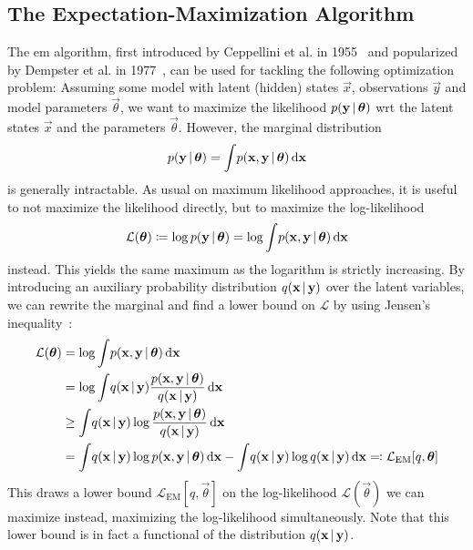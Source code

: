\subsection{The Expectation-Maximization Algorithm}
	The \ac{em} algorithm, first introduced by Ceppellini et al. in 1955~\cite{ceppelliniEstimationGeneFrequencies1955} and popularized by Dempster et al. in 1977~\cite{dempsterMaximumLikelihoodIncomplete1977}, can be used for tackling the following optimization problem: Assuming some model with latent (hidden) states \(\vec{x}\), observations \(\vec{y}\) and model parameters \(\vec{\theta}\), we want to maximize the likelihood \( p(\boldsymbol{\mathrm{y}} \,\vert\, \boldsymbol{\mathrm{\theta}}) \) \ac{wrt} the latent states \(\vec{x}\) and the parameters \(\vec{\theta}\). However, the marginal distribution
	\begin{align*}
		p(\boldsymbol{\mathrm{y}} \,\vert\, \boldsymbol{\mathrm{\theta}}) = \int\! p(\boldsymbol{\mathrm{x}}, \boldsymbol{\mathrm{y}} \,\vert\, \boldsymbol{\mathrm{\theta}}) \dd{\boldsymbol{\mathrm{x}}}
	\end{align*}
	is generally intractable. As usual on maximum likelihood approaches, it is useful to not maximize the likelihood directly, but to maximize the log-likelihood
	\begin{align*}
		\mathcal{L}(\boldsymbol{\mathrm{\theta}}) \coloneqq \log p(\boldsymbol{\mathrm{y}} \,\vert\, \boldsymbol{\mathrm{\theta}}) = \log \int\! p(\boldsymbol{\mathrm{x}}, \boldsymbol{\mathrm{y}} \,\vert\, \boldsymbol{\mathrm{\theta}}) \dd{\boldsymbol{\mathrm{x}}}
	\end{align*}
	instead. This yields the same maximum as the logarithm is strictly increasing. By introducing an auxiliary probability distribution \( q(\boldsymbol{\mathrm{x}} \,\vert\, \boldsymbol{\mathrm{y}}) \) over the latent variables, we can rewrite the marginal and find a lower bound on \(\mathcal{L}\) by using Jensen's inequality~\cite{jensenFonctionsConvexesInegalites1906}:
	\begin{align}
		\mathcal{L}(\boldsymbol{\mathrm{\theta}})
			&= \log \int\! p(\boldsymbol{\mathrm{x}}, \boldsymbol{\mathrm{y}} \,\vert\, \boldsymbol{\mathrm{\theta}}) \dd{\boldsymbol{\mathrm{x}}}  \nonumber \\
			&= \log \int\! q(\boldsymbol{\mathrm{x}} \,\vert\, \boldsymbol{\mathrm{y}}) \frac{p(\boldsymbol{\mathrm{x}}, \boldsymbol{\mathrm{y}} \,\vert\, \boldsymbol{\mathrm{\theta}})}{q(\boldsymbol{\mathrm{x}} \,\vert\, \boldsymbol{\mathrm{y}})} \dd{\boldsymbol{\mathrm{x}}}  \nonumber \\
			&\geq \int\! q(\boldsymbol{\mathrm{x}} \,\vert\, \boldsymbol{\mathrm{y}}) \log \frac{p(\boldsymbol{\mathrm{x}}, \boldsymbol{\mathrm{y}} \,\vert\, \boldsymbol{\mathrm{\theta}})}{q(\boldsymbol{\mathrm{x}} \,\vert\, \boldsymbol{\mathrm{y}})} \dd{\boldsymbol{\mathrm{x}}}  \nonumber \\
			&= \int\! q(\boldsymbol{\mathrm{x}} \,\vert\, \boldsymbol{\mathrm{y}}) \log p(\boldsymbol{\mathrm{x}}, \boldsymbol{\mathrm{y}} \,\vert\, \boldsymbol{\mathrm{\theta}}) \dd{\boldsymbol{\mathrm{x}}} - \int\! q(\boldsymbol{\mathrm{x}} \,\vert\, \boldsymbol{\mathrm{y}}) \log q(\boldsymbol{\mathrm{x}} \,\vert\, \boldsymbol{\mathrm{y}}) \dd{\boldsymbol{\mathrm{x}}} \eqqcolon \mathcal{L}_\mathrm{EM}[q, \boldsymbol{\mathrm{\theta}}]  \label{eq:emLowerBound}
	\end{align}
	This draws a lower bound \( \mathcal{L}_\mathrm{EM}[q, \vec{\theta}] \) on the log-likelihood \( \mathcal{L}(\vec{\theta}) \) we can maximize instead, maximizing the log-likelihood simultaneously. Note that this lower bound is in fact a functional of the distribution \( q(\boldsymbol{\mathrm{x}} \,\vert\, \boldsymbol{\mathrm{y}}) \).

